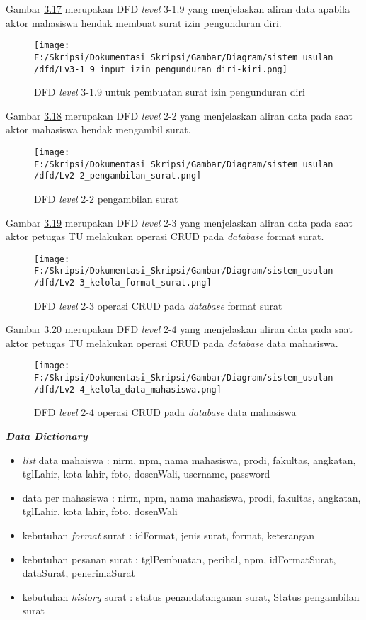 Gambar \hyperlink{level_3-1.9}{3.17} merupakan DFD \textit{level} 3-1.9 yang menjelaskan aliran data apabila aktor mahasiswa hendak membuat surat izin pengunduran diri.
\begin{figure}[H]
	\centering
		\texttt{[image: F:/Skripsi/Dokumentasi\_Skripsi/Gambar/Diagram/sistem\_usulan/dfd/Lv3-1\_9\_input\_izin\_pengunduran\_diri-kiri.png]}
	\caption{DFD \textit{level} 3-1.9 untuk pembuatan surat izin pengunduran diri}
	\label{fig:level_3-1.9}
\end{figure}

Gambar \hyperlink{level_2-2}{3.18} merupakan DFD \textit{level} 2-2 yang menjelaskan aliran data pada saat aktor mahasiswa hendak mengambil surat.

\begin{figure}[H]
	\centering
		\texttt{[image: F:/Skripsi/Dokumentasi\_Skripsi/Gambar/Diagram/sistem\_usulan/dfd/Lv2-2\_pengambilan\_surat.png]}
	\caption{DFD \textit{level} 2-2 pengambilan surat}
	\label{fig:level_2-2}
\end{figure}

Gambar \hyperlink{level_2-3}{3.19} merupakan DFD \textit{level} 2-3 yang menjelaskan aliran data pada saat aktor petugas TU melakukan operasi CRUD pada \textit{database} format surat.

\begin{figure}[H]
	\centering
		\texttt{[image: F:/Skripsi/Dokumentasi\_Skripsi/Gambar/Diagram/sistem\_usulan/dfd/Lv2-3\_kelola\_format\_surat.png]}
	\caption{DFD \textit{level} 2-3 operasi CRUD pada \textit{database} format surat}
	\label{fig:level_2-3}
\end{figure}

Gambar \hyperlink{level_2-4}{3.20} merupakan DFD \textit{level} 2-4 yang menjelaskan aliran data pada saat aktor petugas TU melakukan operasi CRUD pada \textit{database} data mahasiswa.

\begin{figure}[H]
	\centering
		\texttt{[image: F:/Skripsi/Dokumentasi\_Skripsi/Gambar/Diagram/sistem\_usulan/dfd/Lv2-4\_kelola\_data\_mahasiswa.png]}
	\caption{DFD \textit{level} 2-4 operasi CRUD pada \textit{database} data mahasiswa}
	\label{fig:level_2-4}
\end{figure}

\textbf{\textit{Data Dictionary}}\\
\begin{itemize}
 \item \textit{list} data mahaiswa : nirm, npm, nama mahasiswa, prodi, fakultas, angkatan, tglLahir, kota lahir, foto, dosenWali, username, password
 \item data per mahasiswa : nirm, npm, nama mahasiswa, prodi, fakultas, angkatan, tglLahir, kota lahir, foto, dosenWali
 \item kebutuhan \textit{format} surat : idFormat, jenis surat, format, keterangan
 \item kebutuhan pesanan surat : tglPembuatan, perihal, npm, idFormatSurat, dataSurat, penerimaSurat
 \item kebutuhan \textit{history} surat : status penandatanganan surat, Status pengambilan surat
\end{itemize}


